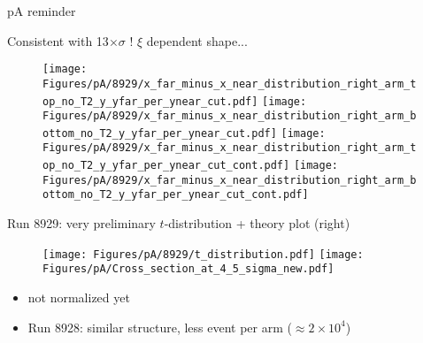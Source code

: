 \documentclass{beamer}
\begin{document}
\begin{frame}\scriptsize
	\Large
	\begin{center}
		pA reminder
	\end{center}
\end{frame}

\begin{frame}
	\vspace{-5mm}
	\begin{block}{Consistent with 13$\times\sigma$ ! $\xi$ dependent shape...}
		\begin{figure}
			\texttt{[image: Figures/pA/8929/x\_far\_minus\_x\_near\_distribution\_right\_arm\_top\_no\_T2\_y\_yfar\_per\_ynear\_cut.pdf]}
			\texttt{[image: Figures/pA/8929/x\_far\_minus\_x\_near\_distribution\_right\_arm\_bottom\_no\_T2\_y\_yfar\_per\_ynear\_cut.pdf]}			
			\texttt{[image: Figures/pA/8929/x\_far\_minus\_x\_near\_distribution\_right\_arm\_top\_no\_T2\_y\_yfar\_per\_ynear\_cut\_cont.pdf]}						
			\texttt{[image: Figures/pA/8929/x\_far\_minus\_x\_near\_distribution\_right\_arm\_bottom\_no\_T2\_y\_yfar\_per\_ynear\_cut\_cont.pdf]}			
		\end{figure}
	\end{block}\vspace{-8mm}

\end{frame}

\begin{frame}
	\vspace{-2mm}
	\begin{block}{Run 8929: very preliminary $t$-distribution + theory plot (right)}
		\begin{figure}
			\texttt{[image: Figures/pA/8929/t\_distribution.pdf]}
			\texttt{[image: Figures/pA/Cross\_section\_at\_4\_5\_sigma\_new.pdf]}
		\end{figure}
		\vspace{-5mm}
		\begin{itemize}
			\item not normalized yet
			\item Run 8928: similar structure, less event per arm ($\approx2\times10^{4}$)
		\end{itemize}			
	\end{block}

\end{frame}
\end{document}
